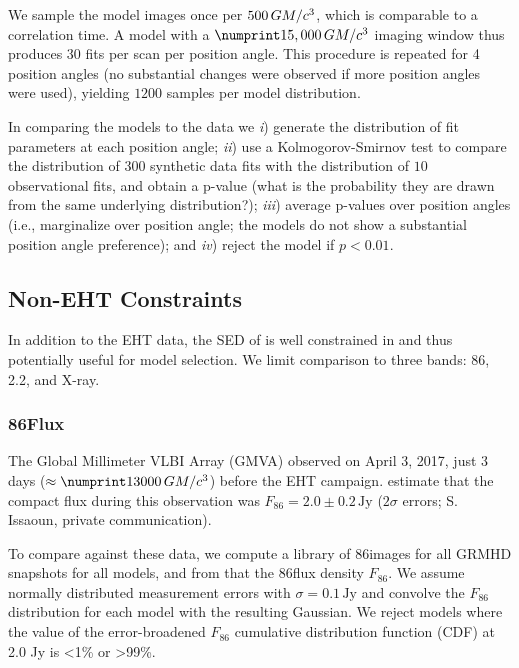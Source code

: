 We sample the model images once per $500\,GM/c^3$, which is comparable to a correlation time.
A model with a $\no{15,000}\,\tg$ imaging window thus produces $30$ fits per scan per position angle.
This procedure is repeated for 4 position angles (no substantial changes were observed if more position angles were used), yielding $1200$ samples per model distribution.

In comparing the models to the data we
\emph{i}) generate the distribution of fit parameters at each position angle;
\emph{ii}) use a Kolmogorov-Smirnov test to compare the distribution of $300$ synthetic data fits with the distribution of $10$ observational fits, and obtain a p-value (what is the probability they are drawn from the same underlying distribution?);
\emph{iii}) average p-values over position angles (i.e., marginalize over position angle; the models do not show a substantial position angle preference); and
\emph{iv}) reject the model if $p < 0.01$.

\subsection{Non-EHT Constraints}

In addition to the EHT data, the SED of \sgra is well constrained in  and thus potentially useful for model selection.
We limit comparison to three bands: 86\GHz, 2.2\um, and X-ray.

\subsubsection{86\GHz Flux}

The Global Millimeter VLBI Array (GMVA) observed \sgra on April 3, 2017, just 3 days ($\approx \no{13000}\,\tg$) before the EHT campaign.
\citet{2019ApJ...871...30I} estimate that the compact flux during this observation was $F_{86} = 2.0 \pm 0.2\,\mathrm{Jy}$ ($2\sigma$ errors; S. Issaoun, private communication).

To compare against these data, we compute a library of 86\GHz images for all GRMHD snapshots for all models, and from that the 86\GHz flux density $F_{86}$.
We assume normally distributed measurement errors with $\sigma = 0.1\,\mathrm{Jy}$ and convolve the $F_{86}$ distribution for each model with the resulting Gaussian.
We reject models where the value of the error-broadened $F_{86}$ cumulative distribution function (CDF) at 2.0 Jy is <1\% or >99\%.


